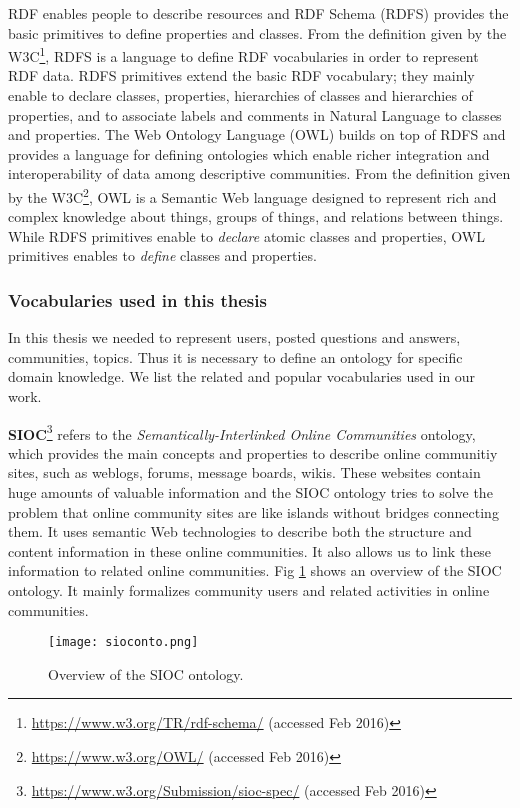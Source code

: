RDF enables people to describe resources and RDF Schema (RDFS) provides the basic primitives to define properties and classes. From the definition given by the W3C\footnote{\url{https://www.w3.org/TR/rdf-schema/} (accessed Feb 2016)}, RDFS is a language to define RDF vocabularies in order to represent RDF data. RDFS primitives extend the basic RDF vocabulary; they mainly enable to declare classes, properties, hierarchies of classes and hierarchies of properties, and to associate labels and comments in Natural Language to classes and properties. 
The Web Ontology Language (OWL) builds on top of RDFS and provides a language for defining ontologies which enable richer integration and interoperability of data among descriptive communities. From the definition given by the W3C\footnote{\url{https://www.w3.org/OWL/} (accessed Feb 2016)}, OWL is a Semantic Web language designed to represent rich and complex knowledge about things, groups of things, and relations between things. While RDFS primitives enable to \textit{declare} atomic classes and properties, OWL primitives enables to  \textit{define} classes and properties. 

\subsubsection{Vocabularies used in this thesis}
In this thesis we needed to represent users, posted questions and answers, communities, topics. Thus it is necessary to define an ontology for specific domain knowledge. We list the related and popular vocabularies used in our work.


\textbf{SIOC}\footnote{\url{https://www.w3.org/Submission/sioc-spec/} (accessed Feb 2016)} refers to the \textit{Semantically-Interlinked Online Communities} ontology, which provides the main concepts and properties to describe online communitiy sites, such as weblogs, forums, message boards, wikis. These websites contain huge amounts of valuable information and the SIOC ontology tries to solve the problem that online community sites are like islands without bridges connecting them. It uses semantic Web technologies to describe both the structure and content information in these online communities. It also allows us to link these information to related online communities. Fig \ref{fig:siocontos} shows an overview of the SIOC ontology. It mainly formalizes community users and related activities in online communities.
 
\begin{figure}%
\centering
\texttt{[image: sioconto.png]}  
\caption{Overview of the SIOC ontology.}
\label{fig:siocontos} 
\end{figure}

